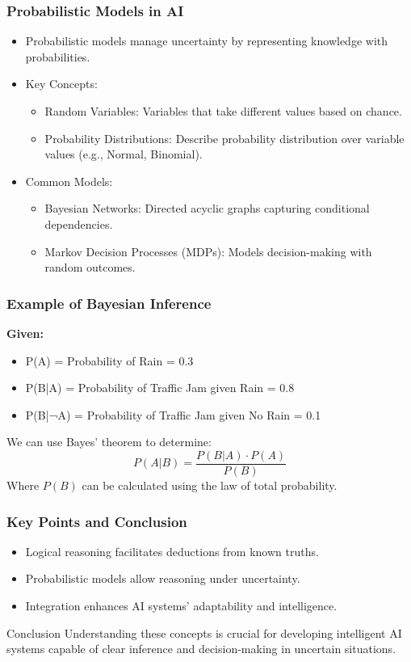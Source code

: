\documentclass[aspectratio=169]{beamer}
\begin{document}
\begin{frame}[fragile]
    \frametitle{Probabilistic Models in AI}
    \begin{itemize}
        \item Probabilistic models manage uncertainty by representing knowledge with probabilities.
        \item Key Concepts:
        \begin{itemize}
            \item Random Variables: Variables that take different values based on chance.
            \item Probability Distributions: Describe probability distribution over variable values (e.g., Normal, Binomial).
        \end{itemize}
        \item Common Models:
        \begin{itemize}
            \item Bayesian Networks: Directed acyclic graphs capturing conditional dependencies.
            \item Markov Decision Processes (MDPs): Models decision-making with random outcomes.
        \end{itemize}
    \end{itemize}
\end{frame}

\begin{frame}[fragile]
    \frametitle{Example of Bayesian Inference}
    \textbf{Given:}
    \begin{itemize}
        \item P(A) = Probability of Rain = 0.3
        \item P(B|A) = Probability of Traffic Jam given Rain = 0.8
        \item P(B|¬A) = Probability of Traffic Jam given No Rain = 0.1
    \end{itemize}
    We can use Bayes’ theorem to determine:
    \begin{equation}
        P(A|B) = \frac{P(B|A) \cdot P(A)}{P(B)}
    \end{equation}
    Where $P(B)$ can be calculated using the law of total probability.
\end{frame}

\begin{frame}[fragile]
    \frametitle{Key Points and Conclusion}
    \begin{itemize}
        \item Logical reasoning facilitates deductions from known truths.
        \item Probabilistic models allow reasoning under uncertainty.
        \item Integration enhances AI systems' adaptability and intelligence.
    \end{itemize}
    \begin{block}{Conclusion}
        Understanding these concepts is crucial for developing intelligent AI systems capable of clear inference and decision-making in uncertain situations.
    \end{block}
\end{frame}
\end{document}
